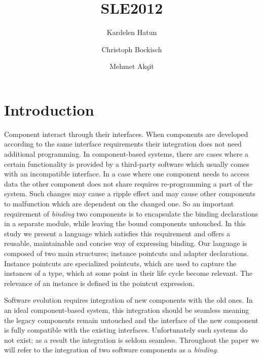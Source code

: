\documentclass{llncs}
\begin{document}
\title{SLE2012}

\author{Kardelen Hatun \and Christoph Bockisch \and Mehmet Ak\c{s}it}

\maketitle
\section{Introduction}

Component interact through their interfaces. When components are developed according to the same interface requirements their integration does not need additional programming. In component-based systems, there are cases where a certain functionality is provided by a third-party software which usually comes with an incompatible interface. In a case where one component needs to access data the other component does not share requires re-programming a part of the system. Such changes may cause a ripple effect and may cause other components to malfunction which are dependent on the changed one. So an important requirement of \emph{binding} two components is to encapsulate the binding declarations in a separate module, while leaving the bound components untouched. In this study we present a language which satisfies this requirement and offers a reusable, maintainable and concise way of expressing binding. Our language is composed of two main structures; instance pointcuts and adapter declarations. Instance pointcuts are specialized pointcuts, which are used to capture the instances of a type, which at some point in their life cycle become relevant. The relevance of an instance is defined in the pointcut expression. 



Software evolution requires integration of new components with the old ones. In an
ideal component-based system, this integration should be seamless meaning 
 the legacy components remain untouched and the interface of the new component is fully compatible with the existing interfaces. 
Unfortunately such systems do not exist; as a result the integration is seldom
seamless. Throughout the paper we will refer to the integration of two software components as a
\emph{binding}. 
\end{document}
